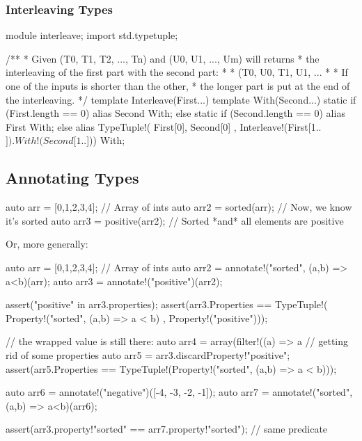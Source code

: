 \subsubsection{Interleaving Types}\label{interleavingtypes}

\begin{dcode}
module interleave;
import std.typetuple;

/**
 * Given (T0, T1, T2, ..., Tn) and (U0, U1, ..., Um) will returns
 * the interleaving of the first part with the second part: 
 *
 * (T0, U0, T1, U1, ...
 *
 * If one of the inputs is shorter than the other, 
 * the longer part is put at the end of the interleaving.
 */
template Interleave(First...)
{
    template With(Second...)
    {
	    static if (First.length == 0)
	        alias Second With;
	    else static if (Second.length == 0)
	        alias First With;
	    else
	        alias TypeTuple!( First[0], Second[0]
	                        , Interleave!(First[1..$]).With!(Second[1..$])) 
                 With;
    }
}
\end{dcode}

\subsection{Annotating Types}\label{annotatingtypes}


\begin{dcode}
auto arr = [0,1,2,3,4]; // Array of ints
auto arr2 = sorted(arr); // Now, we know it's sorted
auto arr3 = positive(arr2); // Sorted *and* all elements are positive
\end{dcode}

Or, more generally:

\begin{dcode}
auto arr = [0,1,2,3,4]; // Array of ints
auto arr2 = annotate!("sorted", (a,b) => a<b)(arr);
auto arr3 = annotate!("positive")(arr2);

assert("positive" in arr3.properties);
assert(arr3.Properties == TypeTuple!( Property!("sorted", (a,b) => a < b)
                                    , Property!("positive")));

// the wrapped value is still there:             
auto arr4 = array(filter!((a) => a%
// getting rid of some properties
auto arr5 = arr3.discardProperty!"positive"; 
assert(arr5.Properties == TypeTuple!(Property!("sorted", (a,b) => a < b)));

auto arr6 = annotate!("negative")([-4, -3, -2, -1]);
auto arr7 = annotate!("sorted", (a,b) => a<b)(arr6);

assert(arr3.property!"sorted" == arr7.property!"sorted"); // same predicate                                    
\end{dcode}

